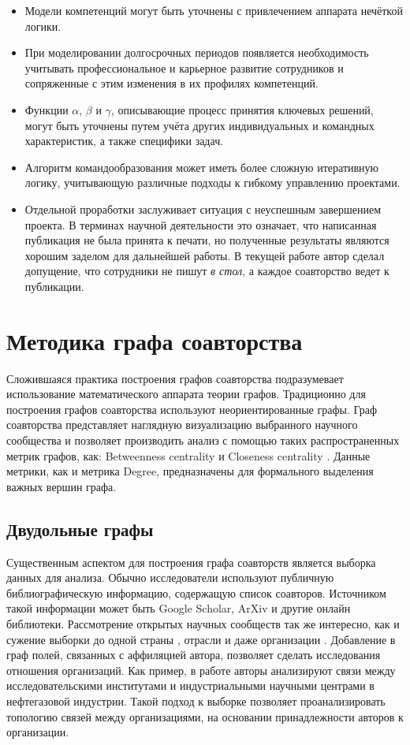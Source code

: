 \begin{itemize}
\item 
Модели компетенций могут быть уточнены с привлечением аппарата нечёткой логики.
\item 
При моделировании долгосрочных периодов появляется необходимость учитывать профессиональное и карьерное развитие сотрудников и сопряженные с этим изменения в их профилях компетенций. 
\item 
Функции $\alpha$, $\beta$ и $\gamma$, описывающие процесс принятия ключевых решений, могут быть уточнены путем учёта других индивидуальных и командных характеристик, а также специфики задач.
\item 
Алгоритм командообразования может иметь более сложную итеративную логику, учитывающую различные подходы к гибкому управлению проектами.
\item 
Отдельной проработки заслуживает ситуация с неуспешным завершением проекта. 
В терминах научной деятельности это означает, что написанная публикация не была принята к печати, но полученные результаты являются хорошим заделом для дальнейшей работы. 
В текущей работе автор сделал допущение, что сотрудники не пишут \textit{в стол}, а каждое соавторство ведет к публикации.
\end{itemize}

\section{Методика графа соавторства}
\label{sec:coath}
Сложившаяся практика построения графов соавторства подразумевает использование математического аппарата теории графов. Традиционно для построения графов соавторства используют неориентированные графы.
Граф соавторства представляет наглядную визуализацию выбранного научного сообщества и позволяет производить анализ с помощью таких распространенных метрик графов, как: Betweenness centrality \cite{leifeld2017collaboration,koseoglu2018authorship,ho2017basic} и Closeness centrality \cite{chang2017hidden,paraschiv2017semantic,ahmed2017analysis}. Данные метрики, как и метрика Degree, предназначены для формального выделения важных вершин графа.

\subsection{Двудольные графы}
Существенным аспектом для построения графа соавторств является выборка данных для анализа. 
Обычно исследователи используют публичную библиографическую информацию, содержащую список соавторов. 
Источником такой информации может быть Google Scholar, ArXiv и другие онлайн библиотеки. 
Рассмотрение открытых научных сообществ так же интересно, как и сужение выборки до одной страны \cite{krasnov2013measurement}, отрасли \cite{gielfi2017university} и даже организации \cite{kradoya2016structure}.
Добавление в граф полей, связанных с аффиляцией автора, позволяет сделать исследования отношения организаций.
Как пример, в работе \cite{gielfi2017university} авторы анализируют связи между исследовательскими институтами и индустриальными научными центрами в нефтегазовой индустрии.
Такой подход к выборке позволяет проанализировать топологию связей между организациями, на основании принадлежности авторов к организации. 

